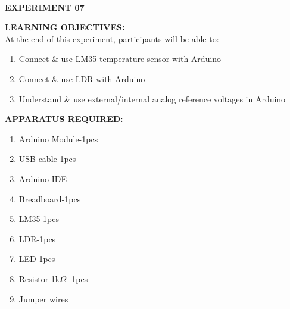 \documentclass[12pt,a4paper]{article}
\begin{document}
\begin{center}

\textbf{\large \\EXPERIMENT 07 }\\[6pt]
\end{center}

\textbf{\large LEARNING OBJECTIVES:}\\[3pt]
At the end of this experiment, participants will be able to:\vspace{-6mm}\begin{enumerate}
 \setlength\itemsep{-0.3em}
\item Connect \& use LM35 temperature sensor with Arduino  \\
\item Connect \& use LDR with Arduino \\
\item Understand \& use external/internal analog  reference voltages in Arduino 
\end{enumerate}
\textbf{\large APPARATUS REQUIRED:}\\
\vspace{-3mm}
\begin{enumerate}
 \setlength\itemsep{-0.3em}
\item Arduino Module-1pcs \\
\item USB cable-1pcs\\
\item Arduino IDE
\item Breadboard-1pcs\\
\item LM35-1pcs\\
\item LDR-1pcs\\
\item LED-1pcs\\
\item Resistor 1k$\Omega$ -1pcs\\
\item Jumper wires\\

\end{enumerate}
\end{document}
